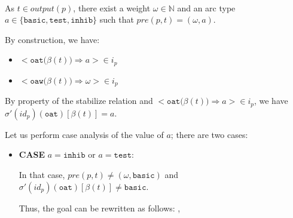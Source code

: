 \documentclass[dvipsnames,12pt]{article}
\begin{document}
\begin{niproof}
\begin{itemize}
\begin{enumerate}
     \\

    As $t\in{}output(p)$, there exist a weight $\omega\in\mathbb{N}$
    and an arc type
    $a\in\{\mathtt{basic},\mathtt{test},\mathtt{inhib}\}$ such that
    $pre(p,t)=(\omega,a)$.

    By construction, we have:    
    \begin{itemize}
    \item
      ${<}\mathtt{oat(}\beta(t)\mathtt{)\Rightarrow{}}a{>}\in{}i_p$
    \item
      ${<}\mathtt{oaw(}\beta(t)\mathtt{)\Rightarrow{}}\omega{>}\in{}i_p$
    \end{itemize}

    By property of the stabilize relation and
    ${<}\mathtt{oat(}\beta(t)\mathtt{)\Rightarrow{}}a{>}\in{}i_p$, we
    have $\sigma'(id_p)(\texttt{oat})[\beta(t)]=a$.
    
    Let us perform case analysis of the value of $a$; there are two
    cases:

    \begin{itemize}
    \item \textbf{CASE} $a=\mathtt{inhib}$ or $a=\mathtt{test}$:

      In that case, $pre(p,t)\neq(\omega,\mathtt{basic})$ and
      $\sigma'(id_p)(\texttt{oat})[\beta(t)]\neq{}\mathtt{basic}$.
      
      Thus, the goal can be rewritten as follows: ,
      

\end{itemize}
\end{enumerate}
\end{itemize}
\end{niproof}
\end{document}
